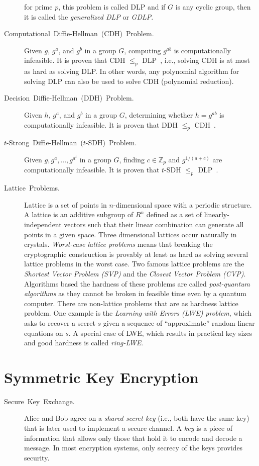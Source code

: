 \documentclass[10pt]{article}
\theoremstyle{plain}
\begin{document}
\begin{description}
	for prime $p$, this problem is called DLP and if $G$ is any cyclic
	group, then it is called the \emph{generalized DLP} or \emph{GDLP}.
	\item [{Computational~Diffie-Hellman~(CDH)~Problem.}] Given $g$, $g^{a}$,
	and $g^{b}$ in a group $G$, computing $g^{ab}$ is computationally
	infeasible. It is proven that CDH $\leq_{p}$ DLP~\cite{vercautern:ecrypt:2013},
	i.e., solving CDH is at most as hard as solving DLP. In other words,
	any polynomial algorithm for solving DLP can also be used to solve
	CDH (polynomial reduction).
	\item [{Decision~Diffie-Hellman~(DDH)~Problem.}] Given $h$, $g^{a}$,
	and $g^{b}$ in a group $G$, determining whether $h=g^{ab}$ is computationally
	infeasible. It is proven that DDH $\leq_{p}$ CDH~\cite{vercautern:ecrypt:2013}.
	\item [{$t$-Strong~Diffie-Hellman~($t$-SDH)~Problem.}] Given $g,g^{a},...,g^{a^{t}}$
	in a group $G$, finding $c\in\mathbb{Z}_{p}$ and $g^{1/(a+c)}$
	are computationally infeasible. It is proven that $t$-SDH $\leq_{p}$
	DLP~\cite{vercautern:ecrypt:2013}.
	\item [{Lattice~Problems.}] Lattice is a set of points in $n$-dimensional
	space with a periodic structure. A lattice is an additive subgroup
	of $R^{n}$ defined as a set of linearly-independent vectors such
	that their linear combination can generate all points in a given space.
	Three dimensional lattices occur naturally in crystals. \emph{Worst-case
		lattice problems} means that breaking the cryptographic construction
	is provably at least as hard as solving several lattice problems in
	the worst case. Two famous lattice problems are the \emph{Shortest
		Vector Problem (SVP)} and the \emph{Closest Vector Problem (CVP)}.
	Algorithms based the hardness of these problems are called \emph{post-quantum
		algorithms} as they cannot be broken in feasible time even by a quantum
	computer. There are non-lattice problems that are as hardness lattice
	problem. One example is the \emph{Learning with Errors (LWE) problem},
	which asks to recover a secret $s$ given a sequence of ``approximate''
	random linear equations on $s$. A special case of LWE, which results
	in practical key sizes and good hardness is called \emph{ring-LWE}.
\end{description}

\section{Symmetric Key Encryption}
\begin{description}
	\item [{Secure~Key~Exchange.}] Alice and Bob agree on a \emph{shared
		secret key} (i.e., both have the same key) that is later used to implement
	a secure channel. A \emph{key} is a piece of information that allows
	only those that hold it to encode and decode a message. In most encryption
	systems, only secrecy of the keys provides security. 
\end{description}
\end{document}
